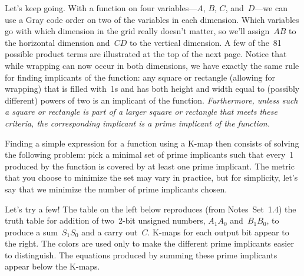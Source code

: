 Let's keep going.  With a function on four variables---$A$, $B$, $C$, 
and~$D$---we can use a Gray code order on two of the variables in 
each dimension.  Which variables go with which dimension in the grid
really doesn't matter, so we'll assign~$AB$ to the horizontal dimension
and~$CD$ to the vertical dimension.  A few of the~81 possible product
terms are illustrated at the top of the next page.  Notice that while wrapping 
can now occur
in both dimensions, we have exactly the same rule for finding implicants
of the function: any square or rectangle (allowing for wrapping) 
that is filled with~1s and has both height and width equal to (possibly
different) powers of two is an implicant of the function.  {\em 
Furthermore, unless such a square or rectangle is part of a larger
square or rectangle that meets these criteria, the corresponding
implicant is a prime implicant of the function.}\\

\centerline{\hspace{0.04in}%
\hspace{0.04in}%
\hspace{0.04in}%
\hspace{0.04in}%
\hspace{0.04in}%
}

Finding a simple expression for a function using a \mbox{K-map} then
consists of solving the following problem: pick a minimal set of prime 
implicants such that every~1 produced by the function is covered
by at least one prime implicant.  The metric that you choose to
minimize the set may vary in practice, but for simplicity, let's say 
that we minimize the number of prime implicants chosen.


Let's try a few!  The table on the left below reproduces (from
Notes~Set~1.4) the truth
table for addition of two~\mbox{2-bit} unsigned numbers, $A_1A_0$
and~$B_1B_0$, to produce a sum~$S_1S_0$ and a carry out~$C$.
\mbox{K-maps} for each output bit appear to the right.
The colors are used only to make the different prime implicants
easier to distinguish.
The equations produced by summing these prime implicants appear
below the \mbox{K-maps}.

